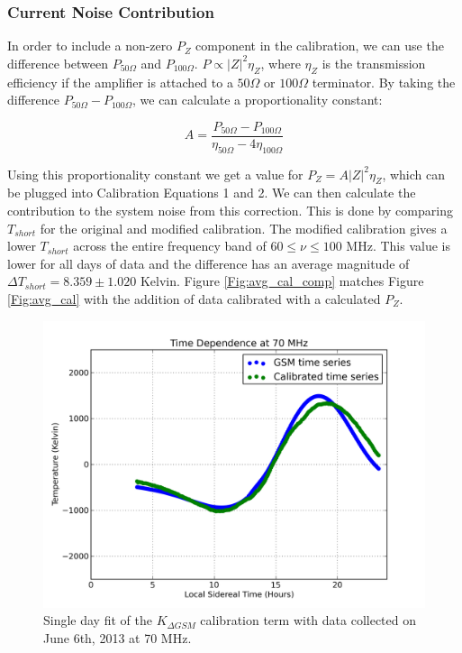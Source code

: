 \subsubsection{Current Noise Contribution}

In order to include a non-zero $P_Z$ component in the calibration, we can use the difference between $P_{50 \Omega}$ and $P_{100 \Omega}$. $P \propto |Z|^2 \eta_{Z}$, where $\eta_Z$ is the transmission efficiency if the amplifier is attached to a $50 \Omega$ or $100 \Omega$ terminator. By taking the difference $P_{50 \Omega}-P_{100 \Omega}$, we can calculate a proportionality constant:

\begin{equation}
A = \frac{P_{50 \Omega} - P_{100 \Omega}}{\eta_{50 \Omega} - 4 \eta_{100 \Omega}}
\end{equation}

Using this proportionality constant we get a value for $P_{Z} = A |Z|^2 \eta_{Z}$, which can be plugged into Calibration Equations 1 and 2. We can then calculate the contribution to the system noise from this correction. This is done by comparing $T_{short}$ for the original and modified calibration. The modified calibration gives a lower $T_{short}$ across the entire frequency band of $60 \leq \nu \leq 100$ MHz. This value is lower for all days of data and the difference has an average magnitude of $\Delta T_{short} = 8.359 \pm 1.020$ Kelvin. Figure \ref{Fig:avg_cal_comp} matches Figure \ref{Fig:avg_cal} with the addition of data calibrated with a calculated $P_{Z}$.

\begin{figure}[htb]
\begin{center}
\includegraphics[width=0.95\linewidth]{Data_analysis/figures/June_06_K_dgsm_time_series.png}
\caption{Single day fit of the $K_{\Delta GSM}$ calibration term with data collected on June 6th, 2013 at 70 MHz. }
\label{Fig:Kdgsm}
\end{center}
\end{figure}

